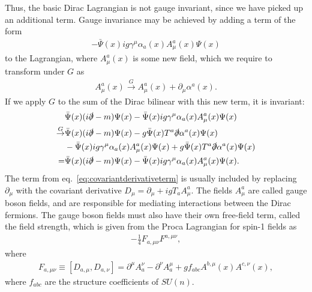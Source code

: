 \documentclass[twoside,english]{uiofysmaster}
\begin{document}
Thus, the basic Dirac Lagrangian is not gauge invariant, since we have picked up an additional term. Gauge invariance may be achieved by adding a term of the form 
\begin{align}
	-\bar\Psi(x) ig\gamma^\mu \alpha_a(x)A^a_\mu(x) \Psi(x)\label{eq:covariantderivativeterm}
\end{align}
to the Lagrangian, where $A^a_\mu(x)$ is some new field, which we require to transform under $G$ as
\begin{align}
	A^a_\mu(x) \overset{G}{\to} A^a_\mu(x) + \partial_\mu \alpha^a(x).
\end{align}
If we apply $G$ to the sum of the Dirac bilinear with this new term, it is invariant:
\begin{align}
	&\bar\Psi(x)(i\slashed\partial - m)\Psi(x) - \bar\Psi(x) ig\gamma^\mu \alpha_a(x)A^a_\mu(x) \Psi(x)\nonumber\\
	\overset{G}{\to} &\bar\Psi(x)(i\slashed\partial - m)\Psi(x) - g\bar\Psi(x) T^a\slashed\partial \alpha^a(x) \Psi(x)\\
	 &- \bar\Psi(x) ig\gamma^\mu \alpha_a(x)A^a_\mu(x) \Psi(x) +  g\bar\Psi(x) T^a\slashed\partial \alpha^a(x) \Psi(x)\nonumber\\
	 = &\bar\Psi(x)(i\slashed\partial - m)\Psi(x) - \bar\Psi(x) ig\gamma^\mu \alpha_a(x)A^a_\mu(x) \Psi(x).\nonumber
\end{align}
The term from eq.\ \eqref{eq:covariantderivativeterm} is usually included by replacing $\partial_\mu$ with the covariant derivative $D_\mu = \partial_\mu + igT_a A^a_\mu$. The fields $A^a_\mu$ are called gauge boson fields, and are responsible for mediating interactions between the Dirac fermions. The gauge boson fields must also have their own free-field term, called the field strength, which is given from the Proca Lagrangian for spin-1 fields as 
\begin{align}
	-\frac{1}{4} F_{a,\mu\nu} F^{a,\mu\nu},
\end{align}
where
\begin{align}
	F_{a,\mu\nu} \equiv [D_{a,\mu}, D_{a,\nu}] = \partial^\mu A_a^\nu - \partial^\nu A_a^\mu + g f_{abc} A^{b,\mu}(x)A^{c,\nu}(x),
\end{align}
where $f_{abc}$ are the structure coefficients of $SU(n)$.
\end{document}

